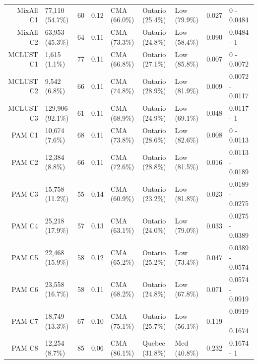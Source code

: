 \documentclass[11pt, a4paper]{article}
\begin{document}
\begin{table}[H]
{\begin{tabular}{|r|llllllll|}
  MixAll C1 & 77,110 (54.7\%) & 60 & 0.12 & CMA (66.0\%) & Ontario (25.4\%) & Low (79.9\%) & 0.027 & 0 - 0.0484 \\
  MixAll C2 & 63,953 (45.3\%) & 64 & 0.11 & CMA (73.3\%) & Ontario (24.8\%) & Low (58.4\%) & 0.090 & 0.0484 - 1 \\
\rowcolor{gray!25}  MCLUST C1 & 1,615 (1.1\%) & 77 & 0.11 & CMA (66.8\%) & Ontario (27.1\%) & Low (85.8\%) & 0.007 & 0 - 0.0072 \\
\rowcolor{gray!25}  MCLUST C2 & 9,542 (6.8\%) & 66 & 0.11 & CMA (74.8\%) & Ontario (28.9\%) & Low (81.9\%) & 0.009 & 0.0072 - 0.0117 \\
 \rowcolor{gray!25} MCLUST C3 & 129,906 (92.1\%) & 61 & 0.11 & CMA (68.9\%) & Ontario (24.9\%) & Low (69.1\%) & 0.048 & 0.0117 - 1 \\
  PAM C1 & 10,674 (7.6\%) & 68 & 0.11 & CMA (73.8\%) & Ontario (28.6\%) & Low (82.6\%) & 0.008 & 0 - 0.0113 \\
  PAM C2 & 12,384 (8.8\%) & 66 & 0.11 & CMA (72.6\%) & Ontario (28.8\%) & Low (81.5\%) & 0.016 & 0.0113 - 0.0189 \\
  PAM C3 & 15,758 (11.2\%) & 55 & 0.14 & CMA (60.9\%) & Ontario (23.2\%) & Low (81.8\%) & 0.023 & 0.0189 - 0.0275 \\
  PAM C4 & 25,218 (17.9\%) & 57 & 0.13 & CMA (63.1\%) & Ontario (24.0\%) & Low (79.0\%) & 0.033 & 0.0275 - 0.0389 \\
  PAM C5 & 22,468 (15.9\%) & 58 & 0.12 & CMA (65.2\%) & Ontario (25.2\%) & Low (73.4\%) & 0.047 & 0.0389 - 0.0574 \\
  PAM C6 & 23,558 (16.7\%) & 58 & 0.11 & CMA (68.2\%) & Ontario (24.8\%) & Low (67.8\%) & 0.071 & 0.0574 - 0.0919 \\
  PAM C7 & 18,749 (13.3\%) & 67 & 0.10 & CMA (75.1\%) & Ontario (25.7\%) & Low (56.1\%) & 0.119 & 0.0919 - 0.1674 \\
  PAM C8 & 12,254 (8.7\%) & 85 & 0.06 & CMA (86.1\%) & Quebec (31.8\%) & Med (40.8\%) & 0.232 & 0.1674 - 1 \\
   \hline
\end{tabular}
}
\end{table}
\end{document}
